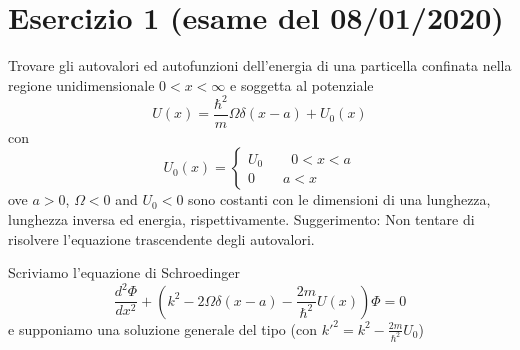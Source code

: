 \documentclass[a4paper]{article}
\begin{document}
    \section*{Esercizio 1 (esame del 08/01/2020)}
        Trovare gli autovalori ed autofunzioni dell'energia di una particella confinata nella regione unidimensionale $0<x<\infty$ e soggetta al potenziale
        \begin{equation*}
            U(x)=\frac{\hbar^2}{m}\Omega\delta(x-a)+U_0(x)
        \end{equation*}
        con
        \begin{equation*}
            U_0(x)=
            \begin{cases}
                U_0 \quad\quad 0<x<a\\
                0 \quad\quad a<x
            \end{cases}
        \end{equation*}
        ove $a > 0$, $\Omega < 0$ and $U_0 < 0$ sono costanti con le dimensioni di una lunghezza, lunghezza inversa ed energia, rispettivamente.
        Suggerimento: Non tentare di risolvere l'equazione trascendente degli autovalori.
        \begin{figure}[H]
            \centering
        \end{figure}
        Scriviamo l'equazione di Schroedinger
        \begin{equation*}
            \frac{d^2\Phi}{dx^2}+\left(k^2-2\Omega\delta(x-a)-\frac{2m}{\hbar^2}U(x)\right)\Phi=0
        \end{equation*}
        e supponiamo una soluzione generale del tipo (con $k'^2=k^2-\frac{2m}{\hbar^2}U_0$)
\end{document}
